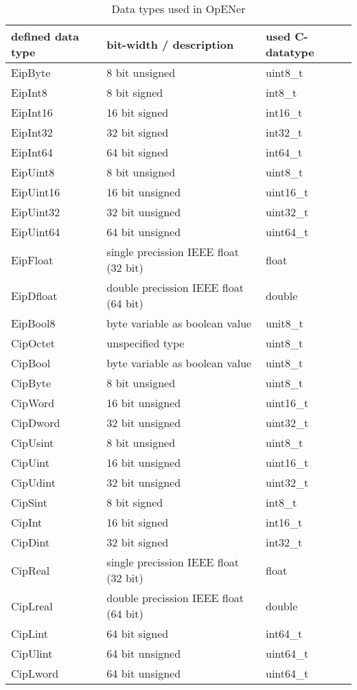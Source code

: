 \documentclass[final,a4paper,10pt, oneside]{article}
\begin{document}
\begin{table}[h] 
\caption{Data types used in OpENer} \label{tab:datatypes}
	\centering 
		\begin{tabular}{lll}
			defined data type	& bit-width / description & used C-datatype \\
			\hline
			EipByte	&	8 bit unsigned	&   uint8\_t\\
			EipInt8	&	8 bit signed	&	int8\_t	 \\
			EipInt16	&	16 bit signed	&	int16\_t	 \\
			EipInt32	&	32 bit signed	&	int32\_t	 \\
			EipInt64 & 64 bit signed & int64\_t \\
			EipUint8	&	8 bit unsigned	&	uint8\_t	 \\
			EipUint16	&	16 bit unsigned	&	uint16\_t	 \\
			EipUint32	&	32 bit unsigned	&	uint32\_t	 \\
			EipUint64 & 64 bit unsigned & uint64\_t \\
			EipFloat	&	single precission IEEE float (32 bit) &	float	 \\
			EipDfloat	&	double precission IEEE float (64 bit) &	double	\\
			EipBool8	&	byte variable as boolean value	&	unit8\_t	 \\
			
			CipOctet & unspecified type & uint8\_t \\
			CipBool & byte variable as boolean value & uint8\_t \\
			CipByte & 8 bit unsigned & uint8\_t \\
			CipWord & 16 bit unsigned & uint16\_t \\
			CipDword & 32 bit unsigned & uint32\_t \\
			CipUsint & 8 bit unsigned & uint8\_t \\
			CipUint & 16 bit unsigned & uint16\_t \\
			CipUdint & 32 bit unsigned & uint32\_t \\
			CipSint & 8 bit signed & int8\_t \\
			CipInt & 16 bit signed & int16\_t \\
			CipDint & 32 bit signed & int32\_t \\
			CipReal & single precission IEEE float (32 bit) & float \\
			CipLreal & double precission IEEE float (64 bit) & double \\

			CipLint & 64 bit signed & int64\_t \\
			CipUlint & 64 bit unsigned & uint64\_t \\
			CipLword & 64 bit unsigned & uint64\_t
		\end{tabular}
\end{table} 
\end{document}
